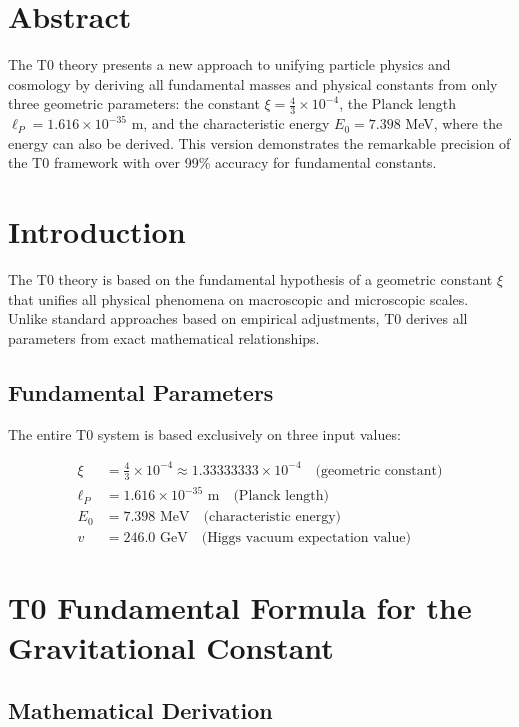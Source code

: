 \section*{Abstract}
		The T0 theory presents a new approach to unifying particle physics and cosmology by deriving all fundamental masses and physical constants from only three geometric parameters: the constant $\xi = \frac{4}{3} \times 10^{-4}$, the Planck length $\ell_P = 1.616 \times 10^{-35}$ m, and the characteristic energy $E_0 = 7.398$ MeV, where the energy can also be derived. This version demonstrates the remarkable precision of the T0 framework with over 99\% accuracy for fundamental constants.

	
	\section{Introduction}
	
	The T0 theory is based on the fundamental hypothesis of a geometric constant $\xi$ that unifies all physical phenomena on macroscopic and microscopic scales. Unlike standard approaches based on empirical adjustments, T0 derives all parameters from exact mathematical relationships.
	
	\subsection{Fundamental Parameters}
	
	The entire T0 system is based exclusively on three input values:
	
	\begin{align}
		\xi &= \frac{4}{3} \times 10^{-4} \approx 1.33333333 \times 10^{-4} \quad \text{(geometric constant)} \\
		\ell_P &= 1.616 \times 10^{-35} \text{ m} \quad \text{(Planck length)} \\
		E_0 &= 7.398 \text{ MeV} \quad \text{(characteristic energy)} \\
		v &= 246.0 \text{ GeV} \quad \text{(Higgs vacuum expectation value)}
	\end{align}
	
	\section{T0 Fundamental Formula for the Gravitational Constant}
	
	\subsection{Mathematical Derivation}
	
